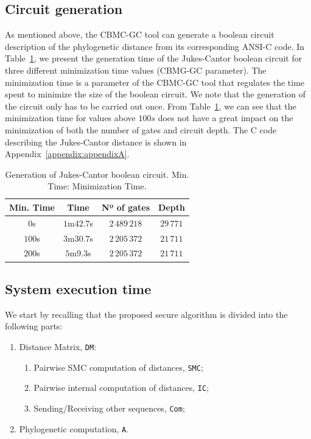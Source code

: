 \subsection{Circuit generation}

As mentioned above, the CBMC-GC tool can generate a boolean circuit description of the phylogenetic distance from its corresponding ANSI-C code. In Table~\ref{table:Com_JK_bool_circ}, we present the generation time of the Jukes-Cantor boolean circuit for three different minimization time values (CBMG-GC parameter). The minimization time is a parameter of the CBMC-GC tool that regulates the time spent to minimize the size of the boolean circuit. We note that the generation of the circuit only has to be carried out once. From Table~\ref{table:Com_JK_bool_circ}, we can see that the minimization time for values above $100s$ does not have a great impact on the minimization of both the number of gates and circuit depth. The C code describing the Jukes-Cantor distance is shown in Appendix~\ref{appendix:appendixA}.

\begin{table}[t]
\centering
\begin{tabular}{cccc}
\toprule
Min. Time & Time & Nº of gates & Depth \\
\midrule
$0$s & $1$m$42.7$s & $2\,489\,218$ & $29\,771$ \\
$100$s & $3$m$30.7$s & $2\,205\,372$ & $21\,711$ \\
$200$s & $5$m$9.3$s & $2\,205\,372$ & $21\,711$ \\ 
\bottomrule
\end{tabular}
\caption{Generation of Jukes-Cantor boolean circuit. Min. Time: Minimization Time.}
\label{table:Com_JK_bool_circ}
\end{table}

\subsection{System execution time}

We start by recalling that the proposed secure algorithm is divided into the following parts:

\begin{enumerate}
    \item Distance Matrix, \texttt{DM}:
    \begin{enumerate}
        \item Pairwise SMC computation of distances, \texttt{SMC};
        \item Pairwise internal computation of distances, \texttt{IC};
        \item Sending/Receiving other sequences, \texttt{Com};
    \end{enumerate}
    \item Phylogenetic computation, \texttt{A}.
\end{enumerate}

